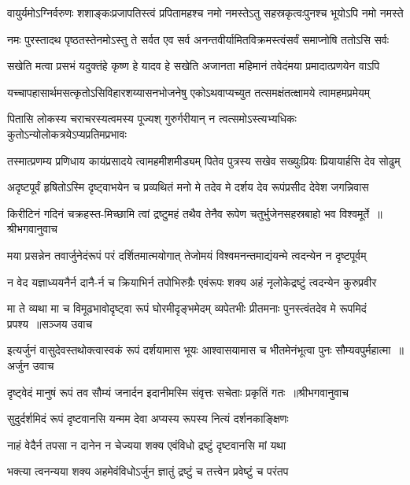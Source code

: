 \twolineshloka
{वायुर्यमोऽग्निर्वरुणः शशाङ्कःप्रजापतिस्त्वं प्रपितामहश्च}
{नमो नमस्तेऽतु सहस्रकृत्वःपुनश्च भूयोऽपि नमो नमस्ते}


\twolineshloka
{नमः पुरस्तादथ पृष्ठतस्तेनमोऽस्तु ते सर्वत एव सर्व}
{अनन्तवीर्यामितविक्रमस्त्वंसर्वं समाप्नोषि ततोऽसि सर्वः}


\twolineshloka
{सखेति मत्वा प्रसभं यदुक्तंहे कृष्ण हे यादव हे सखेति}
{अजानता महिमानं तवेदंमया प्रमादात्प्रणयेन वाऽपि}


\twolineshloka
{यच्चापहासार्थमसत्कृतोऽसिविहारशय्यासनभोजनेषु}
{एकोऽथवाप्यच्युत तत्समक्षंतत्क्षामये त्वामहमप्रमेयम्}


\twolineshloka
{पितासि लोकस्य चराचरस्यत्वमस्य पूज्यश् गुरुर्गरीयान्}
{न त्वत्समोऽस्त्यभ्यधिकः कुतोऽन्योलोकत्रयेऽप्यप्रतिमप्रभावः}


\twolineshloka
{तस्मात्प्रणम्य प्रणिधाय कायंप्रसादये त्वामहमीशमीड्यम्}
{पितेव पुत्रस्य सखेव सख्युःप्रियः प्रियायार्हसि देव सोढुम्}


\twolineshloka
{अदृष्टपूर्वं हृषितोऽस्मि दृष्ट्वाभयेन च प्रव्यथितं मनो मे}
{तदेव मे दर्शय देव रूपंप्रसीद देवेश जगन्निवास}


\threelineshloka
{किरीटिनं गदिनं चक्रहस्त-मिच्छामि त्वां द्रष्टुमहं तथैव}
{तेनैव रूपेण चतुर्भुजेनसहस्रबाहो भव विश्वमूर्ते ॥श्रीभगवानुवाच}
{}


\twolineshloka
{मया प्रसन्नेन तवार्जुनेदंरूपं परं दर्शितमात्मयोगात्}
{तेजोमयं विश्वमनन्तमाद्यंयन्मे त्वदन्येन न दृष्टपूर्वम्}


\twolineshloka
{न वेद यज्ञाध्ययनैर्न दानै-र्न च क्रियाभिर्न तपोभिरुग्रैः}
{एवंरूपः शक्य अहं नृलोकेद्रष्टुं त्वदन्येन कुरुप्रवीर}


\threelineshloka
{मा ते व्यथा मा च विमूढभावोदृष्ट्वा रूपं घोरमीदृङ्भमेदम्}
{व्यपेतभीः प्रीतमनाः पुनस्त्वंतदेव मे रूपमिदं प्रपश्य ॥सञ्जय उवाच}
{}


\threelineshloka
{इत्यर्जुनं वासुदेवस्तथोक्त्वास्वकं रूपं दर्शयामास भूयः}
{आश्वासयामास च भीतमेनंभूत्वा पुनः सौम्यवपुर्महात्मा ॥अर्जुन उवाच}
{}


\threelineshloka
{दृष्ट्वेदं मानुषं रूपं तव सौम्यं जनार्दन}
{इदानीमस्मि संवृत्तः सचेताः प्रकृतिं गतः ॥श्रीभगवानुवाच}
{}


\twolineshloka
{सुदुर्दर्शमिदं रूपं दृष्टवानसि यन्मम}
{देवा अप्यस्य रूपस्य नित्यं दर्शनकाङ्क्षिणः}


\twolineshloka
{नाहं वेदैर्न तपसा न दानेन न चेज्यया}
{शक्य एवंविधो द्रष्टुं दृष्टवानसि मां यथा}


\twolineshloka
{भक्त्या त्वनन्यया शक्य अहमेवंविधोऽर्जुन}
{ज्ञातुं द्रष्टुं च तत्त्वेन प्रवेष्टुं च परंतप}


